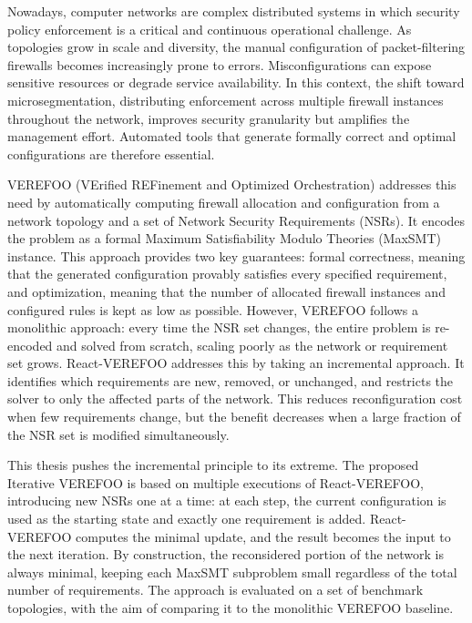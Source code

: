 
Nowadays, computer networks are complex distributed systems in which security policy enforcement is a critical and continuous operational challenge. As topologies grow in scale and diversity, the manual configuration of packet-filtering firewalls becomes increasingly prone to errors. Misconfigurations can expose sensitive resources or degrade service availability. In this context, the shift toward microsegmentation, distributing enforcement across multiple firewall instances throughout the network, improves security granularity but amplifies the management effort. Automated tools that generate formally correct and optimal configurations are therefore essential.

VEREFOO (VErified REFinement and Optimized Orchestration) addresses this need by automatically computing firewall allocation and configuration from a network topology and a set of Network Security Requirements (NSRs). It encodes the problem as a formal Maximum Satisfiability Modulo Theories (MaxSMT) instance. This approach provides two key guarantees: formal correctness, meaning that the generated configuration provably satisfies every specified requirement, and optimization, meaning that the number of allocated firewall instances and configured rules is kept as low as possible. However, VEREFOO follows a monolithic approach: every time the NSR set changes, the entire problem is re-encoded and solved from scratch, scaling poorly as the network or requirement set grows. React-VEREFOO addresses this by taking an incremental approach. It identifies which requirements are new, removed, or unchanged, and restricts the solver to only the affected parts of the network. This reduces reconfiguration cost when few requirements change, but the benefit decreases when a large fraction of the NSR set is modified simultaneously.

This thesis pushes the incremental principle to its extreme. The proposed Iterative VEREFOO is based on multiple executions of React-VEREFOO, introducing new NSRs one at a time: at each step, the current configuration is used as the starting state and exactly one requirement is added. React-VEREFOO computes the minimal update, and the result becomes the input to the next iteration. By construction, the reconsidered portion of the network is always minimal, keeping each MaxSMT subproblem small regardless of the total number of requirements. The approach is evaluated on a set of benchmark topologies, with the aim of comparing it to the monolithic VEREFOO baseline.

